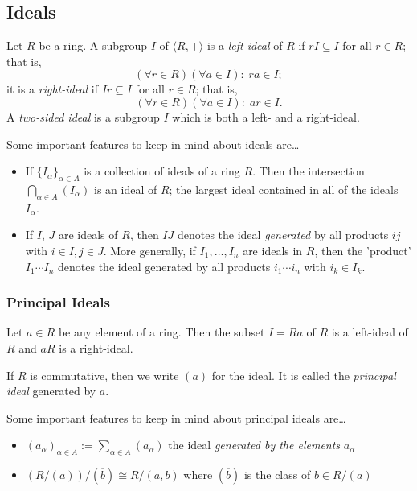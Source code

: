 \subsection{Ideals}\label{ideal}
Let $R$ be a ring. A subgroup $I$ of $\langle R,+ \rangle$ is a \emph{left-ideal} of $R$ if $rI \subseteq I$
for all $r \in R$; that is,
$$(\forall r \in R)(\forall a \in I): \; ra \in I;$$
it is a \emph{right-ideal} if $Ir \subseteq I$ for all $r \in R$; that is,
$$(\forall r \in R)(\forall a \in I): \; ar \in I.$$
A \emph{two-sided ideal} is a subgroup $I$ which is both a left- and a right-ideal.\newline

\noindent Some important features to keep in mind about ideals are\dots
\begin{itemize}
  \item If $\{ I_{\alpha}\}_{\alpha \in A}$ is a collection of ideals of a ring $R$. Then the intersection
  $\bigcap_{\alpha \in A} (I_{\alpha})$ is an ideal of $R$; the largest ideal contained in all of the ideals
  $I_{\alpha}$.
  \item If $I$, $J$ are ideals of $R$, then $IJ$ denotes the ideal \emph{generated} by all products $ij$ with
  $i \in I, j \in J$. More generally, if $I_1, \dots, I_n$ are ideals in $R$, then the 'product' $I_1 \cdots I_n$
  denotes the ideal generated by all products $i_1 \cdots i_n$ with $i_k \in I_k$.
\end{itemize}

\subsubsection{Principal Ideals}\label{principalideal}
Let $a \in R$ be any element of a ring. Then the subset $I = Ra$ of $R$ is a left-ideal of $R$ and $aR$ is a right-ideal.\newline

\noindent If $R$ is commutative, then we write $(a)$ for the ideal. It is called the \emph{principal ideal} generated by $a$.\newline

\noindent Some important features to keep in mind about principal ideals are\dots
\begin{itemize}
  \item $(a_{\alpha})_{\alpha \in A} := \sum_{\alpha \in A} (a_{\alpha})$ the ideal \emph{generated by the elements} $a_{\alpha}$
  \item $(R/(a))/(\overline{b}) \cong R/(a,b)$ where $(\overline{b})$ is the class of $b \in R/(a)$
\end{itemize}

